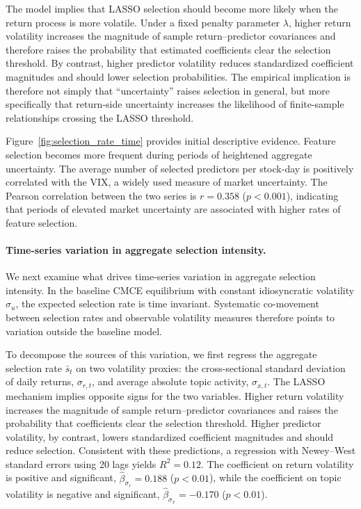 The model implies that LASSO selection should become more likely when the return process is more volatile. Under a fixed penalty parameter $\lambda$, higher return volatility increases the magnitude of sample return--predictor covariances and therefore raises the probability that estimated coefficients clear the selection threshold. By contrast, higher predictor volatility reduces standardized coefficient magnitudes and should lower selection probabilities. The empirical implication is therefore not simply that ``uncertainty'' raises selection in general, but more specifically that return-side uncertainty increases the likelihood of finite-sample relationships crossing the LASSO threshold.

Figure~\ref{fig:selection_rate_time} provides initial descriptive evidence. Feature selection becomes more frequent during periods of heightened aggregate uncertainty. The average number of selected predictors per stock-day is positively correlated with the VIX, a widely used measure of market uncertainty. The Pearson correlation between the two series is $r=0.358$ ($p<0.001$), indicating that periods of elevated market uncertainty are associated with higher rates of feature selection.

\paragraph{Time-series variation in aggregate selection intensity.}

We next examine what drives time-series variation in aggregate selection intensity. In the baseline CMCE equilibrium with constant idiosyncratic volatility $\sigma_u$, the expected selection rate is time invariant. Systematic co-movement between selection rates and observable volatility measures therefore points to variation outside the baseline model.

To decompose the sources of this variation, we first regress the aggregate selection rate $\bar{s}_t$ on two volatility proxies: the cross-sectional standard deviation of daily returns, $\sigma_{r,t}$, and average absolute topic activity, $\sigma_{x,t}$. The LASSO mechanism implies opposite signs for the two variables. Higher return volatility increases the magnitude of sample return--predictor covariances and raises the probability that coefficients clear the selection threshold. Higher predictor volatility, by contrast, lowers standardized coefficient magnitudes and should reduce selection. Consistent with these predictions, a regression with Newey--West standard errors using 20 lags yields $R^2=0.12$. The coefficient on return volatility is positive and significant, $\hat\beta_{\sigma_r}=0.188$ ($p<0.01$), while the coefficient on topic volatility is negative and significant, $\hat\beta_{\sigma_x}=-0.170$ ($p<0.01$).

